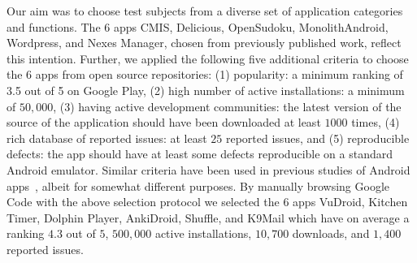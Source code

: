 Our aim was to choose test subjects from a diverse set of application categories and functions. The $6$ apps CMIS, Delicious, OpenSudoku, MonolithAndroid, Wordpress, and Nexes Manager, chosen from previously published work, reflect this intention. Further, we applied the following five additional criteria to choose the $6$ apps from open source repositories: (1) popularity: a minimum ranking of 3.5 out of 5 on Google Play, 
(2) high number of active installations: a minimum of $50{,}000$, (3) having active development communities: the latest version of the source of the application should have been downloaded at least $1000$ times, (4) rich database of reported issues: at least $25$ reported issues, and (5) reproducible defects: the app should have at least some defects reproducible on a standard Android emulator. Similar criteria have been used in previous studies of Android apps~\cite{Hu:2011:AST}, albeit for somewhat different purposes. By manually browsing Google Code with the above selection protocol we selected the $6$ apps VuDroid, Kitchen Timer, Dolphin Player, AnkiDroid, Shuffle, and  K9Mail which have on average a ranking $4.3$ out of $5$, $500{,}000$ active installations, $10{,}700$ downloads, and $1{,}400$ reported issues. 


